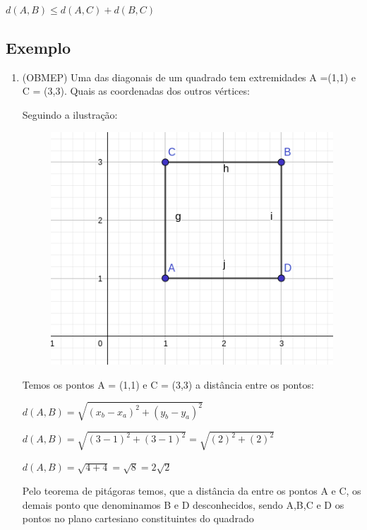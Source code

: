 \begin{multicols*}{2}
    $d(A,B) \le d(A,C) + d(B,C)$

    \subsection{Exemplo}

    \begin{enumerate}
        \item (OBMEP) Uma das diagonais de um quadrado tem extremidades A =(1,1) e C = (3,3). Quais as coordenadas dos outros vértices:

              Seguindo a ilustração:

              \begin{figure}[H]
                  \centering
                  \includegraphics[scale=0.3]{assets/rafael/img29.png}
              \end{figure}

              Temos os pontos A = (1,1) e C = (3,3) a distância entre os pontos:

              $d(A,B) = \sqrt{ (x_b - x_a)^2 + (y_b - y_a)^2 }$

              $d(A,B) = \sqrt{ (3-1)^2 + (3-1)^2 } = \sqrt{(2)^2 + (2)^2}$

              $d(A,B) = \sqrt{ 4+4} = \sqrt{8} = 2 \sqrt{2}$

              Pelo teorema de pitágoras temos, que a distância da entre os pontos A e C, os demais ponto que denominamos B e D desconhecidos, sendo A,B,C e D  os pontos no plano cartesiano constituintes do quadrado


\end{enumerate}
\end{multicols*}
